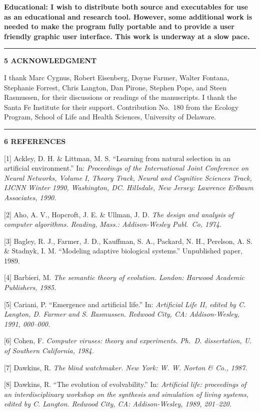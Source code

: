 \bf Educational: \rm  I wish to distribute both source and executables
for use as an educational and research tool.  However, some
additional work is needed to make the program fully portable and to provide
a user friendly graphic user interface.  This work is underway at a slow
pace.

\LP
\rule[6pt]{6.5in}{1pt}
\large \bf 5 ACKNOWLEDGMENT\rm \normalsize
\eLP

I thank Marc Cygnus, Robert Eisenberg, Doyne Farmer, Walter Fontana,
Stephanie Forrest, Chris Langton, Dan Pirone, Stephen Pope, and
Steen Rasmussen, for their discussions or readings of the manuscripts.
I thank the Santa Fe Institute for their support.
Contribution No.\ 180 from the Ecology Program, School
of Life and Health Sciences, University of Delaware.

\newpage

\LP
\rule[6pt]{6.5in}{1pt}
\large \bf 6 REFERENCES\rm \normalsize
\eLP

\XP

[1] Ackley, D. H. \& Littman, M. S.  ``Learning from natural
selection in an artificial environment.''  In: \it Proceedings of the
International Joint Conference on Neural Networks, Volume I, Theory Track,
Neural and Cognitive Sciences Track\rm , IJCNN Winter 1990, Washington, DC.
Hillsdale, New Jersey: Lawrence Erlbaum Associates, 1990.

[2] Aho, A. V., Hopcroft, J. E. \& Ullman, J. D.  \it The design and
analysis of computer algorithms\rm .  Reading, Mass.: Addison-Wesley Publ.\
Co, 1974.

[3] Bagley, R. J., Farmer, J. D., Kauffman, S. A., Packard, N. H., Perelson,
A. S. \& Stadnyk, I. M.  ``Modeling adaptive biological systems.'' Unpublished
paper, 1989.

[4] Barbieri, M.  \it The semantic theory of evolution\rm .  London:
Harwood Academic Publishers, 1985.

[5] Cariani, P.  ``Emergence and artificial life.''  In: \it Artificial
Life II\rm, edited by C. Langton, D. Farmer and S. Rasmussen.
Redwood City, CA: Addison-Wesley, 1991, 000--000.

[6] Cohen, F.  \it Computer viruses: theory and experiments\rm .
Ph.\ D. dissertation, U. of Southern California, 1984.

[7] Dawkins, R.  \it The blind watchmaker\rm .  New York: W. W. Norton
\& Co., 1987.

[8] Dawkins, R.  ``The evolution of evolvability.''  In: \it Artificial life:
proceedings of an interdisciplinary workshop on the synthesis and simulation
of living systems\rm , edited by C. Langton.  Redwood City, CA:
Addison-Wesley, 1989, 201--220.

